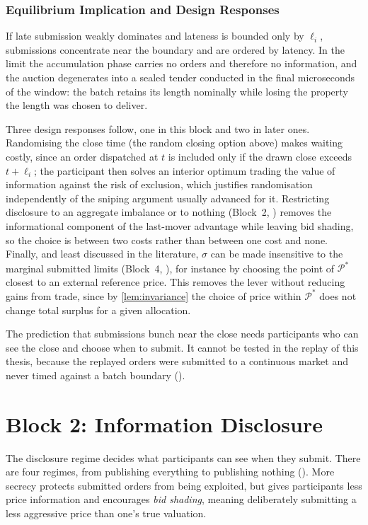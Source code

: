 \subsubsection{Equilibrium Implication and Design Responses}

If late submission weakly dominates and lateness is bounded only by
$\ell_i$, submissions concentrate near the boundary and are ordered by
latency. In the limit the accumulation phase carries no orders and
therefore no information, and the auction degenerates into a sealed tender
conducted in the final microseconds of the window: the batch retains its
length nominally while losing the property the length was chosen to
deliver.

Three design responses follow, one in this block and two in later ones.
Randomising the close time (the random closing option above) makes waiting
costly, since an order dispatched at $t$ is included only if the drawn
close exceeds $t + \ell_i$; the participant then solves an interior
optimum trading the value of information against the risk of exclusion,
which justifies randomisation independently of the sniping argument
usually advanced for it. Restricting disclosure to an aggregate imbalance
or to nothing (Block~2, ) removes the informational
component of the last-mover advantage while leaving bid shading, so the
choice is between two costs rather than between one cost and none.
Finally, and least discussed in the literature, $\sigma$ can be made
insensitive to the marginal submitted limits (Block~4,
), for instance by choosing the point of
$\mathcal{P}^{*}$ closest to an external reference price. This removes the
lever without reducing gains from trade, since by \eqref{lem:invariance}
the choice of price within $\mathcal{P}^{*}$ does not change total surplus
for a given allocation.

The prediction that submissions bunch near the close needs participants
who can see the close and choose when to submit. It cannot be tested in
the replay of this thesis, because the replayed orders were submitted to a
continuous market and never timed against a batch boundary
().

\section{Block 2: Information Disclosure}
\label{sec:disclosure}

The disclosure regime decides what participants can see when they submit.
There are four regimes, from publishing everything to publishing nothing
(). More secrecy protects submitted orders from being
exploited, but gives participants less price information and encourages
\emph{bid shading}, meaning deliberately submitting a less aggressive price
than one's true valuation.

